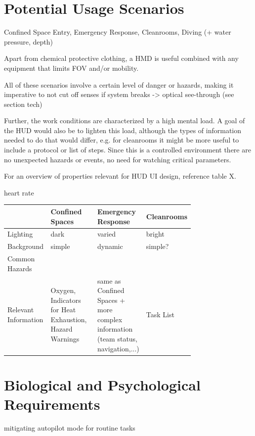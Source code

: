\section{Potential Usage Scenarios}

Confined Space Entry, Emergency Response, Cleanrooms, Diving (+ water pressure, depth)

Apart from chemical protective clothing, a HMD is useful combined with any equipment that limits FOV and/or mobility.

All of these scenarios involve a certain level of danger or hazards, making it imperative to not cut off senses if system breaks -> optical see-through (see section tech)

Further, the work conditions are characterized by a high mental load. A goal of the HUD would also be to lighten this load, although the types of information needed to do that would differ, e.g. for cleanrooms it might be more useful to include a protocol or list of steps. Since this is a controlled environment there are no unexpected hazards or events, no need for watching critical parameters. 

For an overview of properties relevant for HUD UI design, reference table X.

heart rate

\begin{table}[hb]
\begin{tabular}{l | p{0.25\linewidth} | p{0.25\linewidth} | p{0.25\linewidth}}
 & Confined Spaces & Emergency Response & Cleanrooms \\
 \hline
 Lighting & dark & varied & bright \\
 Background & simple & dynamic & simple? \\
 Common Hazards &  &  & \\
 Relevant Information &  Oxygen, Indicators for Heat Exhaustion, Hazard Warnings & same as Confined Spaces + more complex information (team status, navigation,...) & Task List \\
\end{tabular}
\end{table}

\section{Biological and Psychological Requirements}

mitigating autopilot mode for routine tasks

